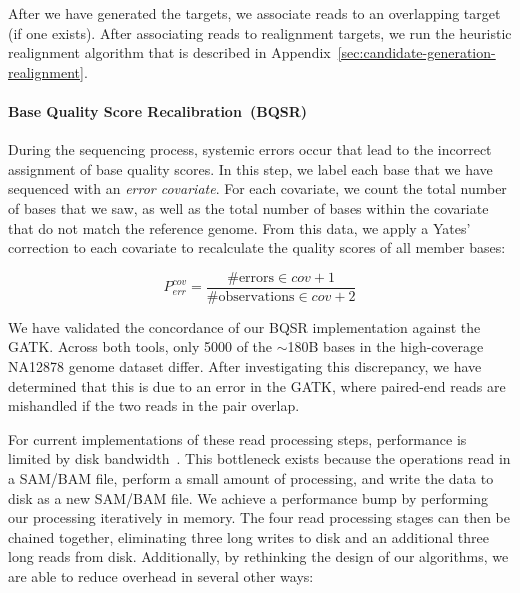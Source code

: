 \documentclass{acm_proc_article-sp}
\begin{document}
After we have generated the targets, we associate reads to an overlapping target (if one exists). After
associating reads to realignment targets, we run the heuristic realignment algorithm that is described
in Appendix~\ref{sec:candidate-generation-realignment}.

\paragraph{Base Quality Score Recalibration~(BQSR)} 
\label{sec:bqsr}
During the sequencing process, systemic errors occur that lead to the incorrect assignment of base
quality scores. In this step, we label each base that we have sequenced with an \emph{error covariate}.
For each covariate, we count the total number of bases that we saw, as well as the total number of
bases within the covariate that do not match the reference genome. From this data, we apply a Yates'
correction to each covariate to recalculate the quality scores of all member bases:

\begin{equation}
\label{eqn:yates}
P_{err}^{cov} = \frac{\text{\# errors} \in cov + 1}{\text{\# observations} \in cov + 2}
\end{equation}

We have validated the concordance of our BQSR implementation against the GATK. Across both tools,
only 5000 of the $\sim$180B bases in the high-coverage NA12878 genome dataset differ. After
investigating this discrepancy, we have determined that this is due to an error in the GATK, where
paired-end reads are mishandled if the two reads in the pair overlap.

For current implementations of these read processing steps, performance is limited by disk
bandwidth~\cite{diao15}. This bottleneck exists because the operations read in a SAM/BAM file, perform
a small amount of processing, and write the data to disk as a new SAM/BAM file. We achieve a
performance bump by performing our processing iteratively in memory. The four read processing stages
can then be chained together, eliminating three long writes to disk and an additional three long reads
from disk. Additionally, by rethinking the design of our algorithms, we are able to reduce overhead in
several other ways:
\end{document}
